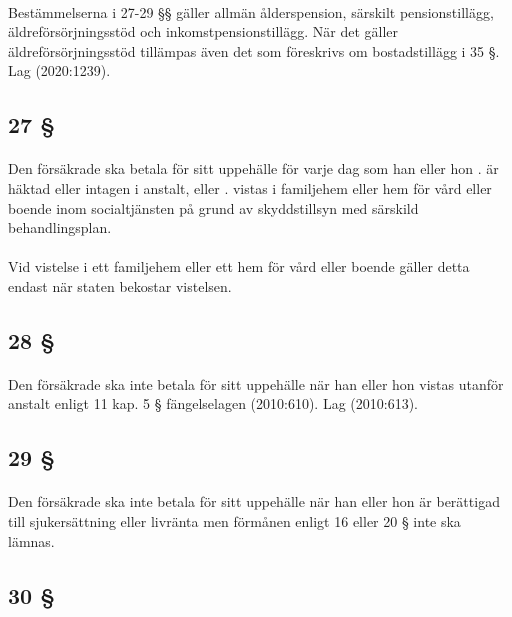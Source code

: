 \documentclass[a4paper,notitlepage,openany,10pt]{book}
\begin{document}
\paragraph*{}
Bestämmelserna i 27-29 §§ gäller allmän ålderspension, särskilt pensionstillägg, äldreförsörjningsstöd och inkomstpensionstillägg. När det gäller äldreförsörjningsstöd tillämpas även det som föreskrivs om bostadstillägg i 35 §.
Lag (2020:1239).
\subsection*{27 §}
\paragraph*{}
Den försäkrade ska betala för sitt uppehälle för varje dag som han eller hon
. är häktad eller intagen i anstalt, eller
. vistas i familjehem eller hem för vård eller boende inom socialtjänsten på grund av skyddstillsyn med särskild behandlingsplan.
\paragraph*{}
Vid vistelse i ett familjehem eller ett hem för vård eller boende gäller detta endast när staten bekostar vistelsen.
\subsection*{28 §}
\paragraph*{}
Den försäkrade ska inte betala för sitt uppehälle när han eller hon vistas utanför anstalt enligt 11 kap. 5 § fängelselagen (2010:610).
Lag (2010:613).
\subsection*{29 §}
\paragraph*{}
Den försäkrade ska inte betala för sitt uppehälle när han eller hon är berättigad till sjukersättning eller livränta men förmånen enligt 16 eller 20 § inte ska lämnas.
\subsection*{30 §}
\end{document}
